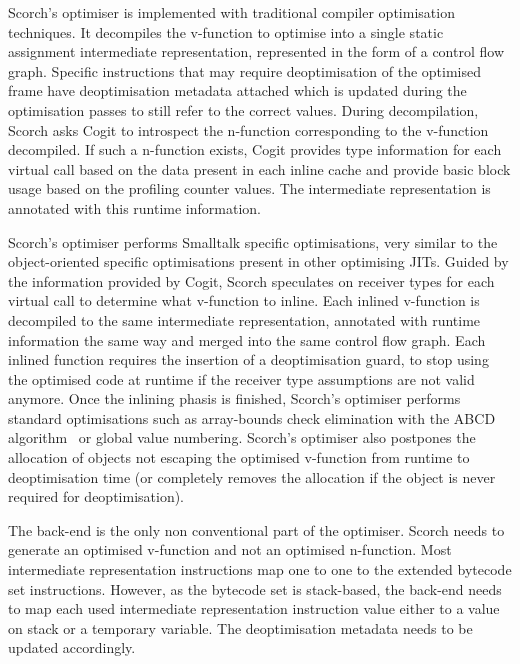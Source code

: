 \documentclass[a4paper,12pt,twoside]{../includes/ThesisStyle}
\begin{document}
Scorch's optimiser is implemented with traditional compiler optimisation techniques. It decompiles the v-function to optimise into a single static assignment intermediate representation, represented in the form of a control flow graph. Specific instructions that may require deoptimisation of the optimised frame have deoptimisation metadata attached which is updated during the optimisation passes to still refer to the correct values. During decompilation, Scorch asks Cogit to introspect the n-function corresponding to the v-function decompiled. If such a n-function exists, Cogit provides type information for each virtual call based on the data present in each inline cache and provide basic block usage based on the profiling counter values. The intermediate representation is annotated with this runtime information.


Scorch's optimiser performs Smalltalk specific optimisations, very similar to the object-oriented specific optimisations present in other optimising JITs. Guided by the information provided by Cogit, Scorch speculates on receiver types for each virtual call to determine what v-function to inline. Each inlined v-function is decompiled to the same intermediate representation, annotated with runtime information the same way and merged into the same control flow graph. Each inlined function requires the insertion of a deoptimisation guard, to stop using the optimised code at runtime if the receiver type assumptions are not valid anymore. Once the inlining phasis is finished, Scorch's optimiser performs standard optimisations such as array-bounds check elimination with the ABCD algorithm~\cite{Bodi00a} or global value numbering. Scorch's optimiser also postpones the allocation of objects not escaping the optimised v-function from runtime to deoptimisation time (or completely removes the allocation if the object is never required for deoptimisation).

The back-end is the only non conventional part of the optimiser. Scorch needs to generate an optimised v-function and not an optimised n-function. Most intermediate representation instructions map one to one to the extended bytecode set instructions. However, as the bytecode set is stack-based, the back-end needs to map each used intermediate representation instruction value either to a value on stack or a temporary variable. The deoptimisation metadata needs to be updated accordingly.
\end{document}
